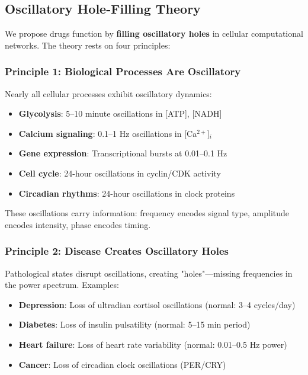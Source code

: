 \documentclass{article}
\begin{document}
\subsection{Oscillatory Hole-Filling Theory}

We propose drugs function by \textbf{filling oscillatory holes} in cellular computational networks. The theory rests on four principles:

\subsubsection{Principle 1: Biological Processes Are Oscillatory}

Nearly all cellular processes exhibit oscillatory dynamics:

\begin{itemize}
    \item \textbf{Glycolysis}: 5--10 minute oscillations in [ATP], [NADH] \citep{Dano1999}
    \item \textbf{Calcium signaling}: 0.1--1 Hz oscillations in [Ca$^{2+}$]$_i$ \citep{Berridge2003}
    \item \textbf{Gene expression}: Transcriptional bursts at 0.01--0.1 Hz \citep{Suter2011}
    \item \textbf{Cell cycle}: 24-hour oscillations in cyclin/CDK activity \citep{Morgan2007}
    \item \textbf{Circadian rhythms}: 24-hour oscillations in clock proteins \citep{Takahashi2017}
\end{itemize}

These oscillations carry information: frequency encodes signal type, amplitude encodes intensity, phase encodes timing.

\subsubsection{Principle 2: Disease Creates Oscillatory Holes}

Pathological states disrupt oscillations, creating "holes"—missing frequencies in the power spectrum. Examples:

\begin{itemize}
    \item \textbf{Depression}: Loss of ultradian cortisol oscillations (normal: 3--4 cycles/day) \citep{Yehuda2009}
    \item \textbf{Diabetes}: Loss of insulin pulsatility (normal: 5--15 min period) \citep{Porksen2002}
    \item \textbf{Heart failure}: Loss of heart rate variability (normal: 0.01--0.5 Hz power) \citep{Task1996}
    \item \textbf{Cancer}: Loss of circadian clock oscillations (PER/CRY) \citep{Sahar2009}
\end{itemize}
\end{document}

